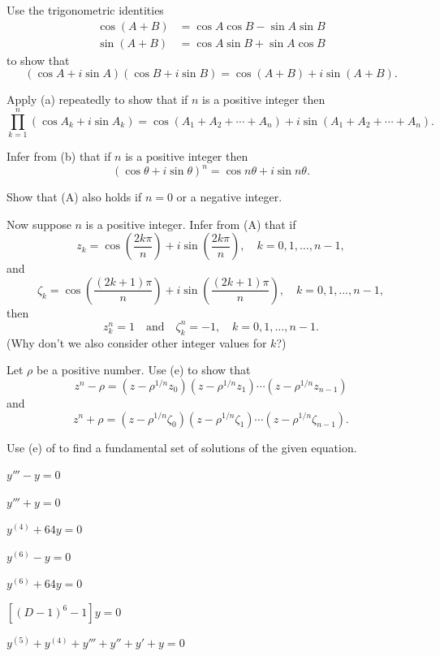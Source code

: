\begin{exerciselist}
\item\label{exer:9.2.42}\begin{alist}
\item %
Use the trigonometric identities
\begin{align*}
\cos(A+B)&=\cos A\cos B-\sin A\sin B\\
\sin(A+B)&=\cos A\sin B+\sin A\cos B
\end{align*}
to show that
\[
(\cos A+i\sin A)(\cos B+i\sin B)=\cos(A+B)+i\sin(A+B).
\]
\item %
Apply (a) repeatedly to show that if $n$ is a positive
integer then
\[
\prod_{k=1}^n(\cos A_k+i\sin A_k)=\cos(A_1+A_2+\cdots+A_n)
+i\sin(A_1+A_2+\cdots+A_n).
\]
\item %
Infer from (b) that if $n$ is a positive integer then
\[
(\cos\theta+i\sin\theta)^n=\cos n\theta+i\sin n\theta.
\tag{A}
\]
\item %
Show that (A) also holds if $n=0$ or a negative integer.
\item %
Now suppose $n$ is a positive integer. Infer from (A)
that if
\[
z_k=\cos\left(\frac{2k\pi}{n}\right)+i\sin\left(\frac{2k\pi}{n}\right)
,\quad k=0,1,\dots,n-1,
\]
and
\[
\zeta_k=\cos\left(\frac{(2k+1)\pi}{n}\right)+i\sin\left(\frac{(2k+1)\pi}{n}\right)
,\quad k=0,1,\dots,n-1,
\]
then
\[
z_k^n=1\quad\text{and}\quad\zeta_k^n=-1,\quad k=0,1,\dots,n-1.
\]
(Why don't we also consider other integer values for $k$?)

\item %
Let $\rho$ be a positive number. Use (e)  to show that
\[
z^n-\rho=(z-\rho^{1/n} z_0)(z-\rho^{1/n}z_1)\cdots(z-\rho^{1/n} z_{n-1})
\]
and
\[
z^n+\rho=(z-\rho^{1/n} \zeta_0)(z-\rho^{1/n} \zeta_1)\cdots(z-\rho^{1/n}
\zeta_{n-1}).
\]
\end{alist}

\item\label{exer:9.2.43}Use (e) of  to find a fundamental set of
solutions of the given equation.
\begin{alist*}[columns=2]
\item $y'''-y=0$
\item $y'''+y=0$
\item $y^{(4)}+64y=0$
\item $y^{(6)}-y=0$
\item $y^{(6)}+64y=0$
\item $\left[(D-1)^6-1\right]y=0$
\item $y^{(5)}+y^{(4)}+y'''+y''+y'+y=0$
\end{alist*}


\end{exerciselist}
